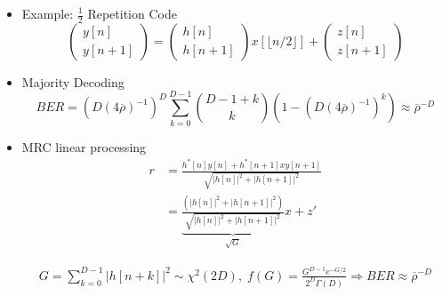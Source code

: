 \documentclass[xcolor=dvipsnames,aspectratio=169]{beamer}
\begin{document}
{  \begin{itemize}
    \item Example: $\frac{1}{2}$ Repetition Code
    $$\left(\begin{array}{c}
                y[n]\\
                y[n+1]
            \end{array}\right)
            =
      \left(\begin{array}{c}
                h[n]\\
                h[n+1]
            \end{array}\right)
            x[ \lfloor n/2\rfloor]
            +
            \left(\begin{array}{c}
                z[n]\\
                z[n+1]
            \end{array}\right)$$
    \item Majority Decoding
    $$BER=\left(D(4\overline{\rho})^{-1} \right)^D\sum_{k=0}^{D-1}{D-1+k \choose k}(1-\left(D(4\overline{\rho})^{-1} \right)^{k})\approx \overline{\rho}^{-D}$$
    \item MRC linear processing
    \begin{equation*}
     \begin{split}
      r&=\frac{h^*[n]y[n]+h^*[n+1]xy[n+1]}{\sqrt{|h[n]|^2+|h[n+1]|^2}}\\
       &=\underset{\sqrt{G}}{\underbrace{\frac{(|h[n]|^2+|h[n+1]|^2)}{\sqrt{|h[n]|^2+|h[n+1]|^2}}}}x+z'
     \end{split}
    \end{equation*}
    \begin{definition}
    \begin{equation*}
     \begin{split}
      G=\sum_{k=0}^{D-1}|h[n+k]|^2\sim \chi^2(2D),\;f(G)=\frac{G^{D-1}e^{-G/2}}{2^{D}\Gamma(D)} \Rightarrow BER \approx \overline{\rho}^{-D}
     \end{split}
    \end{equation*}
    \end{definition}   
\end{itemize}
}
\end{document}
